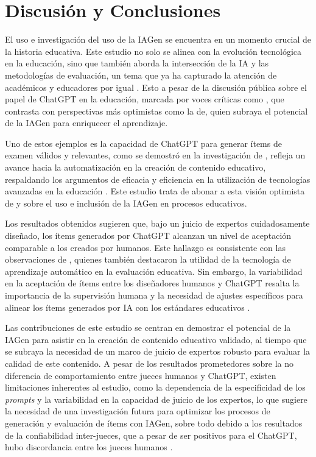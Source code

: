 \section{Discusión y Conclusiones}\label{sec-DiscusiónyConclusiones}

El uso e investigación del uso de la IAGen se encuentra en un momento
crucial de la historia educativa. Este estudio no solo se alinea con la
evolución tecnológica en la educación, sino que también aborda la
intersección de la IA y las metodologías de evaluación, un tema que ya
ha capturado la atención de académicos y educadores por igual \cite{Sadiku2021,Hosseini2023}. Esto a pesar de la discusión pública
sobre el papel de ChatGPT en la educación, marcada por voces críticas
como \textcite{Chomsky2023}, que contrasta con perspectivas
más optimistas como la de\textcite{Yell2023}, quien subraya el potencial de la
IAGen para enriquecer el aprendizaje.

Uno de estos ejemplos es la capacidad de ChatGPT para generar ítems de
examen válidos y relevantes, como se demostró en la investigación de
\textcite{Nasution2023}, refleja un avance hacia la automatización en la
creación de contenido educativo, respaldando los argumentos de eficacia
y eficiencia en la utilización de tecnologías avanzadas en la educación
\cite{Feuerriegel2024,Dimitriadou2023,Tlili2023}. Este estudio trata de abonar a esta visión optimista de \textcite{Yell2023} y \textcite{Nasution2023} sobre el uso e inclusión de la IAGen en procesos educativos.

Los resultados obtenidos sugieren que, bajo un juicio de expertos
cuidadosamente diseñado, los ítems generados por ChatGPT alcanzan un
nivel de aceptación comparable a los creados por humanos. Este hallazgo
es consistente con las observaciones de \textcite{Rauber2024}, quienes
también destacaron la utilidad de la tecnología de aprendizaje
automático en la evaluación educativa. Sin embargo, la variabilidad en
la aceptación de ítems entre los diseñadores humanos y ChatGPT resalta
la importancia de la supervisión humana y la necesidad de ajustes
específicos para alinear los ítems generados por IA con los estándares
educativos \cite{Nasution2023, Ruiz2023}.

Las contribuciones de este estudio se centran en demostrar el potencial
de la IAGen para asistir en la creación de contenido educativo validado,
al tiempo que se subraya la necesidad de un marco de juicio de expertos
robusto para evaluar la calidad de este contenido. A pesar de los
resultados prometedores sobre la no diferencia de comportamiento entre
jueces humanos y ChatGPT, existen limitaciones inherentes al estudio,
como la dependencia de la especificidad de los \emph{prompts} y la
variabilidad en la capacidad de juicio de los expertos, lo que sugiere
la necesidad de una investigación futura para optimizar los procesos de
generación y evaluación de ítems con IAGen, sobre todo debido a los
resultados de la confiabilidad inter-jueces, que a pesar de ser
positivos para el ChatGPT, hubo discordancia entre los jueces humanos
\cite{Galicia2017}.


